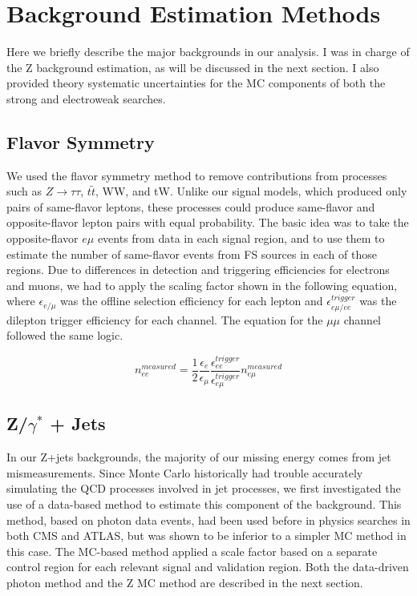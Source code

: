 \chapter{Background Estimation Methods}

Here we briefly describe the major backgrounds in our analysis. I was in charge of the Z background estimation, as will be discussed in the next section. I also provided theory systematic uncertainties for the MC components of both the strong and electroweak searches.

\section{Flavor Symmetry}

We used the flavor symmetry method to remove contributions from processes such as $Z\rightarrow\tau\tau$, $t\tilde{t}$, WW, and tW. Unlike our signal models, which produced only pairs of same-flavor leptons, these processes could produce same-flavor and opposite-flavor lepton pairs with equal probability. The basic idea was to take the opposite-flavor $e\mu$ events from data in each signal region, and to use them to estimate the number of same-flavor events from FS sources in each of those regions. Due to differences in detection and triggering efficiencies for electrons and muons, we had to apply the scaling factor shown in the following equation, where $\epsilon_{e/\mu}$ was the offline selection efficiency for each lepton and $\epsilon_{e\mu/ee}^{trigger}$ was the dilepton trigger efficiency for each channel. The equation for the $\mu\mu$ channel followed the same logic.

\begin{equation}
n_{ee}^{measured} = \frac{1}{2}\frac{\epsilon_e}{\epsilon_{\mu}}\frac{\epsilon_{ee}^{trigger}}{\epsilon_{e\mu}^{trigger}}n_{e\mu}^{measured}
\end{equation}

\section{Z/$\gamma^*$ + Jets}

In our Z+jets backgrounds, the majority of our missing energy comes from jet mismeasurements. Since Monte Carlo historically had trouble accurately simulating the QCD processes involved in jet processes, we first investigated the use of a data-based method to estimate this component of the background. This method, based on photon data events, had been used before in physics searches in both CMS and ATLAS, but was shown to be inferior to a simpler MC method in this case. The MC-based method applied a scale factor based on a separate control region for each relevant signal and validation region. Both the data-driven photon method and the Z MC method are described in the next section.

